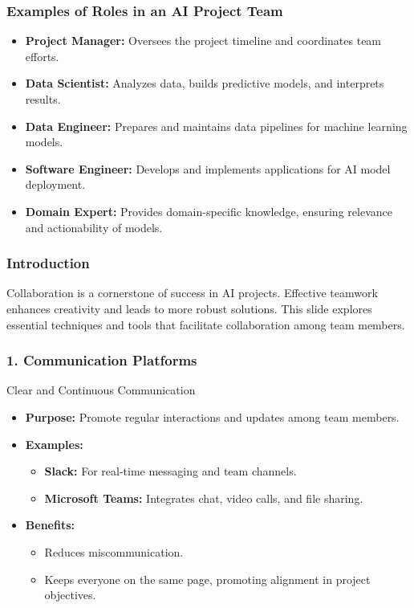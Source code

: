 \documentclass[aspectratio=169]{beamer}
\begin{document}
\begin{frame}[fragile]
  \frametitle{Examples of Roles in an AI Project Team}
  \begin{itemize}
    \item \textbf{Project Manager:} Oversees the project timeline and coordinates team efforts.
    
    \item \textbf{Data Scientist:} Analyzes data, builds predictive models, and interprets results.
    
    \item \textbf{Data Engineer:} Prepares and maintains data pipelines for machine learning models.
    
    \item \textbf{Software Engineer:} Develops and implements applications for AI model deployment.
    
    \item \textbf{Domain Expert:} Provides domain-specific knowledge, ensuring relevance and actionability of models.
  \end{itemize}  
\end{frame}

\begin{frame}[fragile]
    \frametitle{Introduction}
    Collaboration is a cornerstone of success in AI projects. Effective teamwork enhances creativity and leads to more robust solutions. This slide explores essential techniques and tools that facilitate collaboration among team members.
\end{frame}

\begin{frame}[fragile]
    \frametitle{1. Communication Platforms}
    \begin{block}{Clear and Continuous Communication}
    \begin{itemize}
        \item \textbf{Purpose:} Promote regular interactions and updates among team members.
        \item \textbf{Examples:}
            \begin{itemize}
                \item \textbf{Slack:} For real-time messaging and team channels.
                \item \textbf{Microsoft Teams:} Integrates chat, video calls, and file sharing.
            \end{itemize}
        \item \textbf{Benefits:}
            \begin{itemize}
                \item Reduces miscommunication.
                \item Keeps everyone on the same page, promoting alignment in project objectives.
            \end{itemize}
    \end{itemize}
    \end{block}
\end{frame}
\end{document}
